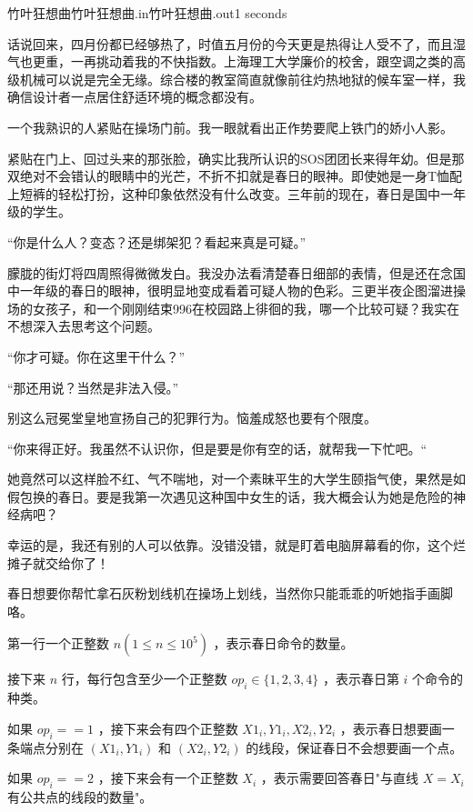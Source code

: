 \begin{problem}{竹叶狂想曲}{竹叶狂想曲.in}{竹叶狂想曲.out}{1 seconds}


话说回来，四月份都已经够热了，时值五月份的今天更是热得让人受不了，而且湿气也更重，一再挑动着我的不快指数。上海理工大学廉价的校舍，跟空调之类的高级机械可以说是完全无缘。综合楼的教室简直就像前往灼热地狱的候车室一样，我确信设计者一点居住舒适环境的概念都没有。

一个我熟识的人紧贴在操场门前。我一眼就看出正作势要爬上铁门的娇小人影。

紧贴在门上、回过头来的那张脸，确实比我所认识的SOS团团长来得年幼。但是那双绝对不会错认的眼睛中的光芒，不折不扣就是春日的眼神。即使她是一身T恤配上短裤的轻松打扮，这种印象依然没有什么改变。三年前的现在，春日是国中一年级的学生。

“你是什么人？变态？还是绑架犯？看起来真是可疑。”

朦胧的街灯将四周照得微微发白。我没办法看清楚春日细部的表情，但是还在念国中一年级的春日的眼神，很明显地变成看着可疑人物的色彩。三更半夜企图溜进操场的女孩子，和一个刚刚结束996在校园路上徘徊的我，哪一个比较可疑？我实在不想深入去思考这个问题。

“你才可疑。你在这里干什么？”

“那还用说？当然是非法入侵。”

别这么冠冕堂皇地宣扬自己的犯罪行为。恼羞成怒也要有个限度。

“你来得正好。我虽然不认识你，但是要是你有空的话，就帮我一下忙吧。“ 

她竟然可以这样脸不红、气不喘地，对一个素昧平生的大学生颐指气使，果然是如假包换的春日。要是我第一次遇见这种国中女生的话，我大概会认为她是危险的神经病吧？

幸运的是，我还有别的人可以依靠。没错没错，就是盯着电脑屏幕看的你，这个烂摊子就交给你了！

春日想要你帮忙拿石灰粉划线机在操场上划线，当然你只能乖乖的听她指手画脚咯。


\InputFile

第一行一个正整数 $n (1 \leq n \leq 10^5)$ ，表示春日命令的数量。

接下来 $n$ 行，每行包含至少一个正整数 $op_i \in \{ 1,2,3,4 \}$ ，表示春日第 $i$ 个命令的种类。

如果 $op_i==1$ ，接下来会有四个正整数 ${X1}_i,{Y1}_i,{X2}_i,{Y2}_i$ ，表示春日想要画一条端点分别在 $({X1}_i,{Y1}_i)$ 和 $({X2}_i,{Y2}_i)$ 的线段，保证春日不会想要画一个点。

如果 $op_i==2$ ，接下来会有一个正整数 $X_i$ ，表示需要回答春日"与直线 $X=X_i$ 有公共点的线段的数量"。


\end{problem}
